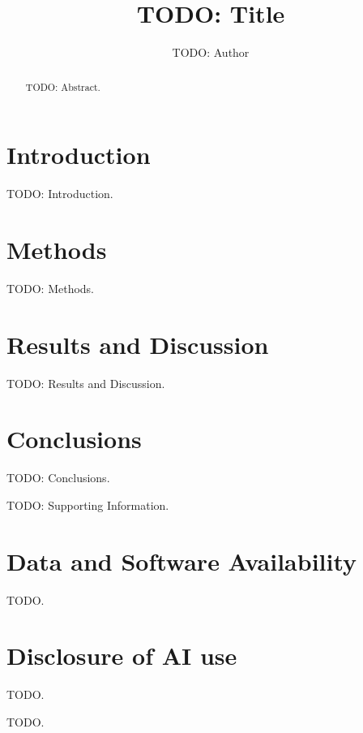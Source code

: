 \documentclass[journal=jcisd8,manuscript=article]{achemso}
\author{TODO: Author}
\affiliation{TODO: Affiliation}
\title{TODO: Title}
\begin{document}
\begin{abstract}
TODO: Abstract.
\end{abstract}

\section{Introduction}
TODO: Introduction.

\section{Methods}
TODO: Methods.

\section{Results and Discussion}
TODO: Results and Discussion.

\section{Conclusions}
TODO: Conclusions.

\begin{suppinfo}
TODO: Supporting Information.
\end{suppinfo}

\section*{Data and Software Availability}
TODO.

\section*{Disclosure of AI use}
TODO.

\begin{acknowledgement}
TODO.
\end{acknowledgement}


\end{document}
